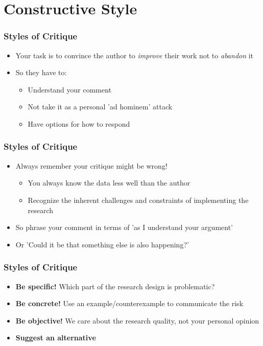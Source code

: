 \documentclass[xcolor=x11names,compress]{beamer}\usepackage[]{graphicx}\usepackage[]{xcolor}
\renewcommand{\(}{\begin{columns}}
\renewcommand{\)}{\end{columns}}
\newcommand{\<}[1]{\begin{column}{#1}}
\renewcommand{\>}{\end{column}}
\begin{document}
\section{Constructive Style}

\begin{frame}
\frametitle{Styles of Critique}
\begin{itemize}
\item Your task is to convince the author to \textit{improve} their work not to \textit{abandon} it
\pause
\item So they have to:
\begin{itemize}
\item Understand your comment
\pause
\item Not take it as a personal 'ad hominem' attack
\pause
\item Have options for how to respond
\end{itemize}
\end{itemize}
\end{frame}

\begin{frame}
\frametitle{Styles of Critique}
\begin{itemize}
\item Always remember your critique might be wrong!
\pause
\begin{itemize}
\item You always know the data less well than the author
\pause
\item Recognize the inherent challenges and constraints of implementing the research
\pause
\end{itemize}
\item So phrase your comment in terms of 'as I understand your argument'
\pause
\item Or 'Could it be that something else is also happening?'
\end{itemize}
\end{frame}

\begin{frame}
\frametitle{Styles of Critique}
\begin{itemize}
\item \textbf{Be specific!} Which part of the research design is problematic?
\pause
\item \textbf{Be concrete!} Use an example/counterexample to communicate the risk
\pause
\item \textbf{Be objective!} We care about the research quality, not your personal opinion
\pause
\item \textbf{Suggest an alternative}
\end{itemize}
\end{frame}
\end{document}
